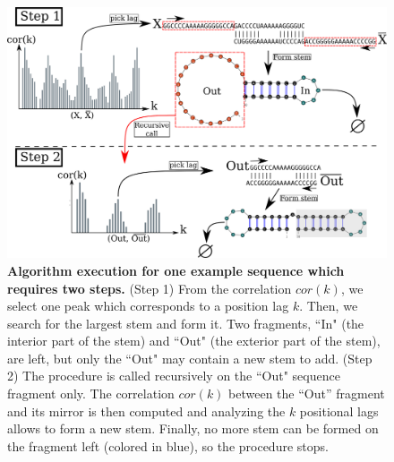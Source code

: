 \begin{figure}[t!]
	\centering
	\includegraphics[width=1.\linewidth]{../res/images/rafft/algo_draw.png}
	\caption{\label{algo_desc}\textbf{Algorithm execution for one example sequence which requires two steps.} (Step 1) From the correlation $cor(k)$, we select one peak which corresponds to a position lag $k$. Then, we search for the largest stem and form it. Two fragments, ``In" (the interior part of the stem) and ``Out" (the exterior part of the stem), are left, but only the ``Out" may contain a new stem to add. (Step 2) The procedure is called recursively on the ``Out" sequence fragment only. The correlation $cor(k)$ between the ``Out'' fragment and its mirror is then computed and analyzing the $k$ positional lags allows to form a new stem. Finally, no more stem can be formed on the fragment left (colored in blue), so the procedure stops.}
\end{figure}

